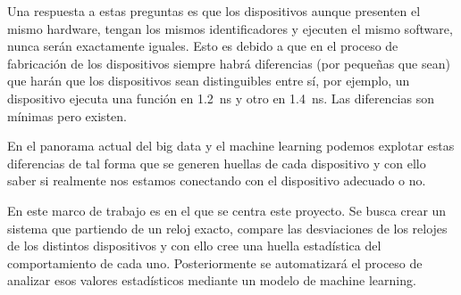 Una respuesta a estas preguntas es que los dispositivos aunque presenten el mismo hardware, tengan los mismos identificadores y ejecuten el mismo software, nunca serán exactamente iguales. Esto es debido a que en el proceso de fabricación de los dispositivos siempre habrá diferencias (por pequeñas que sean) que harán que los dispositivos sean distinguibles entre sí, por ejemplo, un dispositivo ejecuta una función en \SI{1.2}{\nano\second} y otro en \SI{1.4}{\nano\second}. Las diferencias son mínimas pero existen.

En el panorama actual del big data y el machine learning podemos explotar estas diferencias de tal forma que se generen huellas de cada dispositivo y con ello saber si realmente nos estamos conectando con el dispositivo adecuado o no.

En este marco de trabajo es en el que se centra este proyecto. Se busca crear un sistema que partiendo de un reloj exacto, compare las desviaciones de los relojes de los distintos dispositivos y con ello cree una huella estadística del comportamiento de cada uno. Posteriormente se automatizará el proceso de analizar esos valores estadísticos mediante un modelo de machine learning.

